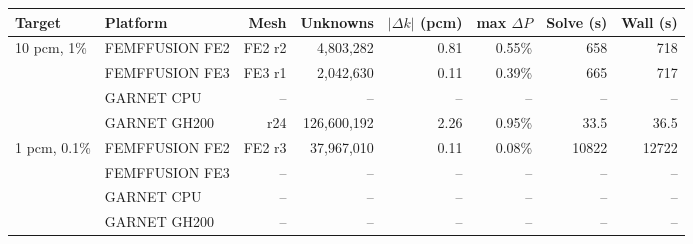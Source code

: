 \begin{tabular}{llrrrrrr}
\hline
Target & Platform & Mesh & Unknowns & $|\Delta k|$ (pcm) & max $\Delta P$ & Solve (s) & Wall (s) \\
\hline
10 pcm, 1\% & FEMFFUSION FE2 & FE2 r2 & 4,803,282 & 0.81 & 0.55\% & 658 & 718 \\
 & FEMFFUSION FE3 & FE3 r1 & 2,042,630 & 0.11 & 0.39\% & 665 & 717 \\
 & GARNET CPU & -- & -- & -- & -- & -- & -- \\
 & GARNET GH200 & r24 & 126,600,192 & 2.26 & 0.95\% & 33.5 & 36.5 \\
\hline
1 pcm, 0.1\% & FEMFFUSION FE2 & FE2 r3 & 37,967,010 & 0.11 & 0.08\% & 10822 & 12722 \\
 & FEMFFUSION FE3 & -- & -- & -- & -- & -- & -- \\
 & GARNET CPU & -- & -- & -- & -- & -- & -- \\
 & GARNET GH200 & -- & -- & -- & -- & -- & -- \\
\hline
\end{tabular}
